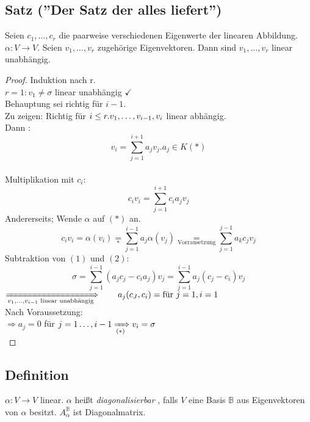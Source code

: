 \subsection{Satz (''Der Satz der alles liefert'')}\label{sec:\thesubsection}
Seien $c_1,\ldots,c_r$ die paarweise verschiedenen Eigenwerte der linearen Abbildung. $\alpha : V  \to V$. Seien $v_1,\ldots,v_r$ zugehörige Eigenvektoren. Dann sind $v_1,\ldots,v_r$ linear unabhängig.
\begin{proof}
Induktion nach r.\\
$r = 1: v_1 \ne \sigma$ linear unabhängig $\checkmark$\\
Behauptung sei richtig für $i-1$.\\
Zu zeigen: Richtig für $i \leq r.\\
v_1,\ldots,v_{i-1},v_i$ linear abhängig.\\
Dann : \[v_i = \sum\limits^{i+1}_{j=1} a_jv_j. a_j \in K (\ast)\]\\
Multiplikation mit $c_i:$
\setcounter{equation}{0}
\begin{equation}
c_iv_i=\sum\limits^{i+1}_{j=1}c_ia_jv_j
\end{equation}
Andererseits; Wende $\alpha$ auf $(\ast)$ an.
\begin{equation}
c_iv_i = \alpha(v_i) \underset{\ast}{=} \sum\limits^{i-1}_{j=1}a_j\alpha(v_j) \underset{\text{Vorrausetzung}}{=} \sum\limits^{j-1}_{j=1} a_kc_jv_j
\end{equation}
Subtraktion von $(1)$ und $(2)$:\\
\[ \sigma = \sum\limits^{i-1}_{j=1} (a_jc_j-c_ia_j)v_j = \sum\limits^{i-1}_{j=1}a_j (c_j-c_i) v_j \]
$\xRightarrow[v_1,\ldots,v_{i-1} \text{ linear unabhängig} ]{} \qquad a_j (c_J,c_i) = \\ \text{für }j=1, i=1 $\\
Nach Voraussetzung:\\
$\Rightarrow a_j = 0$ für $j=1\ldots,i-1\\
\xRightarrow[(\ast)]{}v_i = \sigma$\Lightning\\
\end{proof}
\subsection{Definition}\label{sec:\thesubsection}
$\alpha : V \to V$ linear. $\alpha$ hei\ss t \emph{diagonalisierbar} , falls $V$ eine Basis $\mathbb{B}$ aus Eigenvektoren von $\alpha$ besitzt. $A^{\mathbb{B}}_\alpha$ ist Diagonalmatrix.
